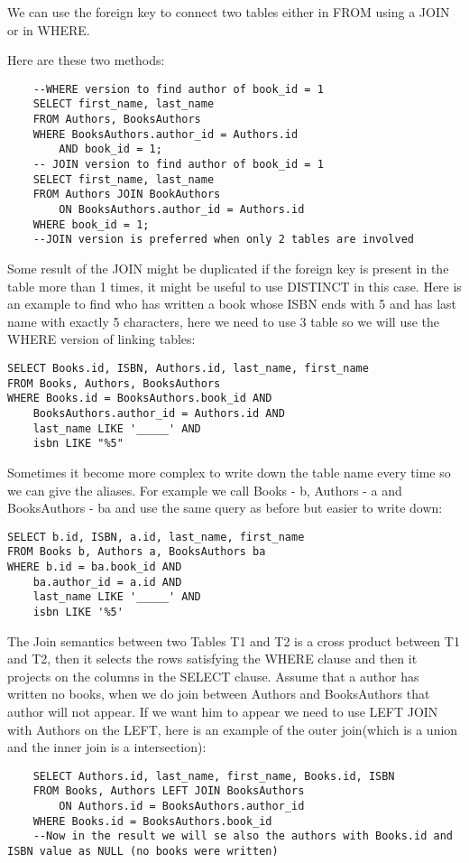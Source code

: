 \documentclass[a4page, 11pt]{article}
\begin{document}
We can use the foreign key to connect two tables either in FROM using a JOIN or in WHERE.

Here are these two methods:

\begin{lstlisting}
	--WHERE version to find author of book_id = 1
	SELECT first_name, last_name
	FROM Authors, BooksAuthors
	WHERE BooksAuthors.author_id = Authors.id
		AND book_id = 1;
	-- JOIN version to find author of book_id = 1
	SELECT first_name, last_name
	FROM Authors JOIN BookAuthors
		ON BooksAuthors.author_id = Authors.id
	WHERE book_id = 1;
	--JOIN version is preferred when only 2 tables are involved
\end{lstlisting}

Some result of the JOIN might be duplicated if the foreign key is present in the table more than 1 times, it might be useful to use DISTINCT in this case.
Here is an example to find who has written a book whose ISBN ends with 5 and has last name with exactly 5 characters, here we need to use 3 table so we will use the WHERE version of linking tables:
\begin{lstlisting}
SELECT Books.id, ISBN, Authors.id, last_name, first_name
FROM Books, Authors, BooksAuthors
WHERE Books.id = BooksAuthors.book_id AND
	BooksAuthors.author_id = Authors.id AND
	last_name LIKE '_____' AND
	isbn LIKE "%5"
\end{lstlisting}

Sometimes it become more complex to write down the table name every time so we can give the aliases. For example we call Books - b, Authors - a and BooksAuthors - ba and use the same query as before but easier to write down:
\begin{lstlisting}
SELECT b.id, ISBN, a.id, last_name, first_name
FROM Books b, Authors a, BooksAuthors ba
WHERE b.id = ba.book_id AND
	ba.author_id = a.id AND	
	last_name LIKE '_____' AND
	isbn LIKE '%5'
\end{lstlisting}
The Join semantics between two Tables T1 and T2 is a cross product between T1 and T2, then it selects the rows satisfying the WHERE clause and then it projects on the columns in the SELECT clause.\newline
Assume that a author has written no books, when we do join between Authors and BooksAuthors that author will not appear. 
If we want him to appear we need to use LEFT JOIN with Authors on the LEFT, here is an example of the outer join(which is a union and the inner join is a intersection):
\begin{lstlisting}
	SELECT Authors.id, last_name, first_name, Books.id, ISBN
	FROM Books, Authors LEFT JOIN BooksAuthors
		ON Authors.id = BooksAuthors.author_id
	WHERE Books.id = BooksAuthors.book_id
	--Now in the result we will se also the authors with Books.id and ISBN value as NULL (no books were written)
\end{lstlisting}
\end{document}
